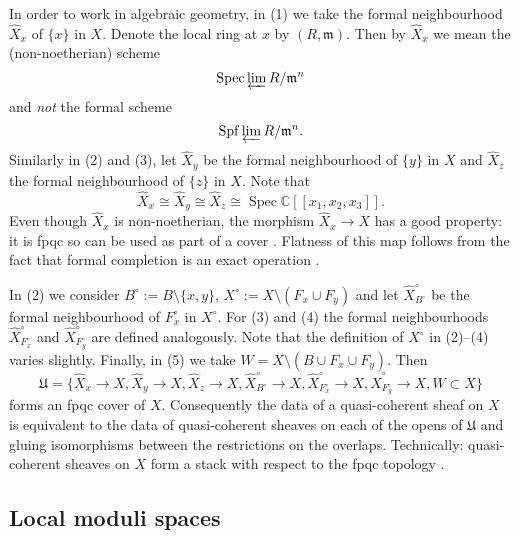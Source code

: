 \documentclass{amsart}
\theoremstyle{definition}
\newcommand{\CC} {\mathbb{C}}          %
\newcommand{\Spec}{\operatorname{Spec}}
\begin{document}
In order to work in algebraic geometry, in (1) we take the formal neighbourhood $\widehat{X}_x$ of $\{x\}$ in $X$. Denote the local ring at $x$ by $(R,\mathfrak{m})$. Then by $\widehat{X}_x$ we mean the (non-noetherian) scheme
$$
\Spec \varprojlim R / \mathfrak{m}^n 
$$
and \emph{not} the formal scheme $$\mathrm{Spf} \varprojlim R / \mathfrak{m}^n.$$ Similarly in (2) and (3), let $\widehat{X}_y$ be the formal neighbourhood of $\{y\}$ in $X$ and $\widehat{X}_z$ the formal neighbourhood of $\{z\}$ in $X$. Note that 
$$
\widehat{X}_x \cong \widehat{X}_y \cong \widehat{X}_z \cong\Spec \CC[\![x_1,x_2,x_3]\!].
$$
Even though $\widehat{X}_x$ is non-noetherian, the morphism $\widehat{X}_x \rightarrow X$ has a good property: it is fpqc so can be used as part of a cover \cite[Sect.~2.3.2]{Vis}. Flatness of this map follows from the fact that formal completion is an exact operation \cite[Prop.~10.14]{AM}. 

In (2) we consider $B^\circ := B \setminus \{x,y\}$, $X^\circ := X \setminus (F_x  \cup F_y)$ and let $\widehat{X}^{\circ}_{B^\circ}$ be the formal neighbourhood of $F_{x}^{\circ}$ in $X^\circ$. For (3) and (4) the formal neighbourhoods $\widehat{X}^{\circ}_{F_{x}^{\circ}}$ and $\widehat{X}^{\circ}_{F_{y}^{\circ}}$ are defined analogously. Note that the definition of $X^\circ$ in (2)--(4) varies slightly. Finally, in (5) we take $W = X \setminus (B \cup F_x \cup F_y)$. Then
$$
\mathfrak{U} = \{\widehat{X}_x \rightarrow X, \widehat{X}_y \rightarrow X, \widehat{X}_z \rightarrow X, \widehat{X}^{\circ}_{B^\circ} \rightarrow X, \widehat{X}^{\circ}_{F_{x}^{\circ}} \rightarrow X, \widehat{X}^{\circ}_{F_{y}^{\circ}} \rightarrow X, W \subset X\}
$$
forms an fpqc cover of $X$. Consequently the data of a quasi-coherent sheaf on $X$ is equivalent to the data of quasi-coherent sheaves on each of the opens of $\mathfrak{U}$ and gluing isomorphisms between the restrictions on the overlaps. Technically: quasi-coherent sheaves on $X$ form a stack with respect to the fpqc topology \cite[Thm.~4.23]{Vis}.


\subsection{Local moduli spaces} \label{localmod}
\end{document}
